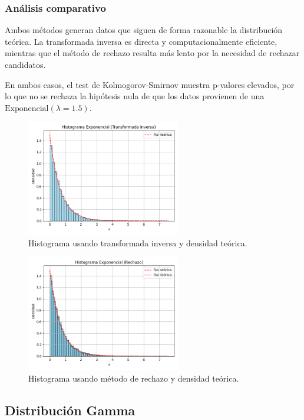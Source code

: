 \documentclass{article}
\begin{document}
\subsubsection{Análisis comparativo}

Ambos métodos generan datos que siguen de forma razonable la distribución teórica. La transformada inversa es directa y computacionalmente eficiente, mientras que el método de rechazo resulta más lento por la necesidad de rechazar candidatos.

En ambos casos, el test de Kolmogorov-Smirnov muestra p-valores elevados, por lo que no se rechaza la hipótesis nula de que los datos provienen de una $\text{Exponencial}(\lambda = 1.5)$.

\begin{figure}[H]
    \centering
    \includegraphics[width=0.6\textwidth]{visualizaciones/exponencial_Transformada Inversa.png}
    \caption{Histograma usando transformada inversa y densidad teórica.}
\end{figure}

\begin{figure}[H]
    \centering
    \includegraphics[width=0.6\textwidth]{visualizaciones/exponencial_Rechazo.png}
    \caption{Histograma usando método de rechazo y densidad teórica.}
\end{figure}


\subsection{Distribución Gamma}
\end{document}

